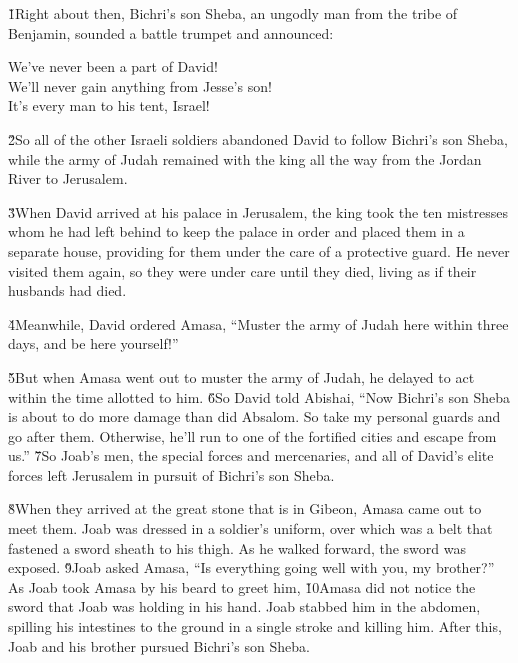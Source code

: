 \v{1}Right about then, Bichri's son Sheba, an ungodly man from the tribe of Benjamin, sounded a battle trumpet and announced:

\begin{poetry}
\poeml We've never been a part of David! \\
\poemll    We'll never gain anything from Jesse's son! \\
\poemlll       It's every man to his tent, Israel!
\end{poetry}

\v{2}So all of the other Israeli soldiers abandoned David to follow Bichri's son Sheba, while the army of Judah remained with the king all the way from the Jordan River to Jerusalem.

\v{3}When David arrived at his palace in Jerusalem, the king took the ten mistresses whom he had left behind to keep the palace in order and placed them in a separate house, providing for them under the care of a protective guard. He never visited them again, so they were under care until they died, living as if their husbands had died.

\v{4}Meanwhile, David ordered Amasa, ``Muster the army of Judah here within three days, and be here yourself!''

\v{5}But when Amasa went out to muster the army of Judah, he delayed to act within the time allotted to him. \v{6}So David told Abishai, ``Now Bichri's son Sheba is about to do more damage than did Absalom. So take my personal guards and go after them. Otherwise, he'll run to one of the fortified cities and escape from us.'' \v{7}So Joab's men, the special forces and mercenaries, and all of David's elite forces left Jerusalem in pursuit of Bichri's son Sheba.

\v{8}When they arrived at the great stone that is in Gibeon, Amasa came out to meet them. Joab was dressed in a soldier's uniform, over which was a belt that fastened a sword sheath to his thigh. As he walked forward, the sword was exposed. \v{9}Joab asked Amasa, ``Is everything going well with you, my brother?'' As Joab took Amasa by his beard to greet him, \v{10}Amasa did not notice the sword that Joab was holding in his hand. Joab stabbed him in the abdomen, spilling his intestines to the ground in a single stroke and killing him. After this, Joab and his brother pursued Bichri's son Sheba.

